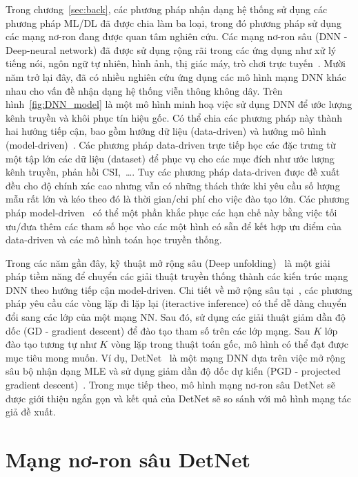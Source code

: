 Trong chương~\ref{sec:back}, các phương pháp nhận dạng hệ thống sử dụng các phương pháp ML/DL đã được chia làm ba loại, trong đó phương pháp sử dụng các mạng nơ-ron đang được quan tâm nghiên cứu. Các mạng nơ-ron sâu (DNN - Deep-neural network) đã được sử dụng rộng rãi trong các ứng dụng như xử lý tiếng nói, ngôn ngữ tự nhiên, hình ảnh, thị giác máy, trò chơi trực tuyến~\cite{Samek2021}. Mười năm trở lại đây, đã có nhiều nghiên cứu ứng dụng các mô hình mạng DNN khác nhau cho vấn đề nhận dạng hệ thống viễn thông không dây. Trên hình~\ref{fig:DNN_model} là một mô hình minh hoạ việc sử dụng DNN để ước lượng kênh truyền và khôi phục tín hiệu gốc. Có thể chia các phương pháp này thành hai hướng tiếp cận, bao gồm hướng dữ liệu (data-driven) và hướng mô hình (model-driven)~\cite{Liao2020}. Các phương pháp data-driven trực tiếp học các đặc trưng từ một tập lớn các dữ liệu (dataset) để phục vụ cho các mục đích như ước lượng kênh truyền, phản hồi CSI,~\ldots. Tuy các phương pháp data-driven được đề xuất đều cho độ chính xác cao nhưng vẫn có những thách thức khi yêu cầu số lượng mẫu rất lớn và kéo theo đó là thời gian/chi phí cho việc đào tạo lớn. Các phương pháp model-driven~\cite{He2019} có thể một phần khắc phục các hạn chế này bằng việc tối ưu/đưa thêm các tham số học vào các một hình có sẵn để kết hợp ưu điểm của data-driven và các mô hình toán học truyền thống. 

Trong các năm gần đây, kỹ thuật mở rộng sâu (Deep unfolding)~\cite{Wisdom2016} là một giải pháp tiềm năng để chuyển các giải thuật truyền thống thành các kiến trúc mạng DNN theo hướng tiếp cận model-driven. Chi tiết về mở rộng sâu tại~\cite{John2014}, các phương pháp yêu cầu các vòng lặp đi lặp lại (iteractive inference) có thể dễ dàng chuyển đổi sang các lớp của một mạng NN. Sau đó, sử dụng các giải thuật giảm dần độ dốc (GD - gradient descent) để đào tạo tham số trên các lớp mạng. Sau $K$ lớp đào tạo tương tự như $K$ vòng lặp trong thuật toán gốc, mô hình có thể đạt được mục tiêu mong muốn. Ví dụ, DetNet~\cite{Samuel2017} là một mạng DNN dựa trên việc mở rộng sâu bộ nhận dạng MLE và sử dụng giảm dần độ dốc dự kiến (PGD - projected gradient descent)~\cite{Chen2015}. Trong mục tiếp theo, mô hình mạng nơ-ron sâu DetNet sẽ được giới thiệu ngắn gọn và kết quả của DetNet sẽ so sánh với mô hình mạng tác giả đề xuất.

\section{Mạng nơ-ron sâu DetNet}

